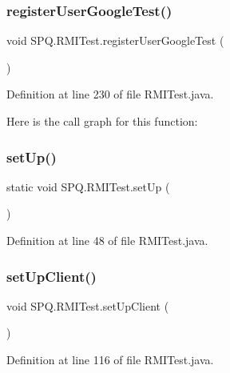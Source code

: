 \subsubsection{\texorpdfstring{register\+User\+Google\+Test()}{registerUserGoogleTest()}}
{\footnotesize\ttfamily void S\+P\+Q.\+R\+M\+I\+Test.\+register\+User\+Google\+Test (\begin{DoxyParamCaption}{ }\end{DoxyParamCaption})}



Definition at line 230 of file R\+M\+I\+Test.\+java.

Here is the call graph for this function\+:
\mbox{\label{class_s_p_q_1_1_r_m_i_test_ab314266e24b54a7e2f482a3a0b48edaf}} 
\subsubsection{\texorpdfstring{set\+Up()}{setUp()}}
{\footnotesize\ttfamily static void S\+P\+Q.\+R\+M\+I\+Test.\+set\+Up (\begin{DoxyParamCaption}{ }\end{DoxyParamCaption})\hspace{0.3cm}{\ttfamily [static]}}



Definition at line 48 of file R\+M\+I\+Test.\+java.

\mbox{\label{class_s_p_q_1_1_r_m_i_test_a7ec13d55d5cb3716468c3e9d7b5740d3}} 
\subsubsection{\texorpdfstring{set\+Up\+Client()}{setUpClient()}}
{\footnotesize\ttfamily void S\+P\+Q.\+R\+M\+I\+Test.\+set\+Up\+Client (\begin{DoxyParamCaption}{ }\end{DoxyParamCaption})}



Definition at line 116 of file R\+M\+I\+Test.\+java.

